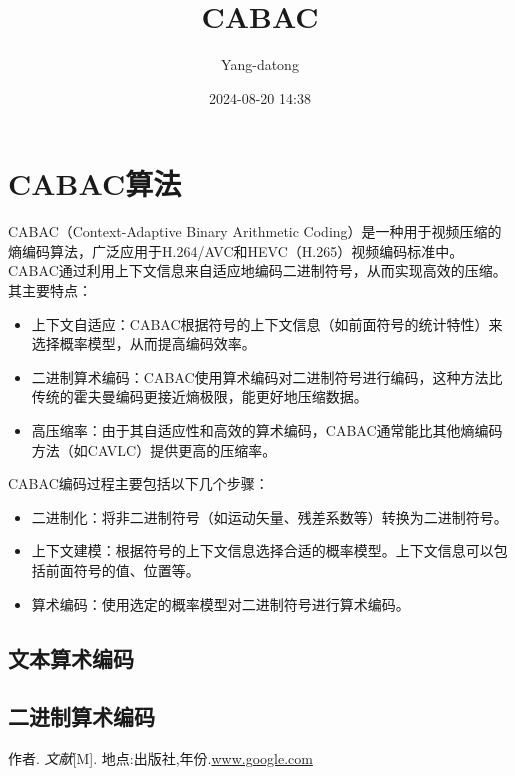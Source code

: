 \documentclass{/home/hi/Study/template/code}
\title{CABAC}
\author{\textcopyright Yang-datong }
\date{2024-08-20 14:38}
\begin{document}
\makehead
\section{CABAC算法}
CABAC（Context-Adaptive Binary Arithmetic Coding）是一种用于视频压缩的熵编码算法，广泛应用于H.264/AVC和HEVC（H.265）视频编码标准中。CABAC通过利用上下文信息来自适应地编码二进制符号，从而实现高效的压缩。其主要特点：
\begin{itemize}
	\item 上下文自适应：CABAC根据符号的上下文信息（如前面符号的统计特性）来选择概率模型，从而提高编码效率。
	\item 二进制算术编码：CABAC使用算术编码对二进制符号进行编码，这种方法比传统的霍夫曼编码更接近熵极限，能更好地压缩数据。
	\item 高压缩率：由于其自适应性和高效的算术编码，CABAC通常能比其他熵编码方法（如CAVLC）提供更高的压缩率。
\end{itemize}

CABAC编码过程主要包括以下几个步骤：
\begin{itemize}
	\item 二进制化：将非二进制符号（如运动矢量、残差系数等）转换为二进制符号。
	\item 上下文建模：根据符号的上下文信息选择合适的概率模型。上下文信息可以包括前面符号的值、位置等。
	\item 算术编码：使用选定的概率模型对二进制符号进行算术编码。
\end{itemize}

\subsection{文本算术编码}

\subsection{二进制算术编码}

\newpage
\begin{thebibliography}{1}
	 作者. \emph{文献}[M]. 地点:出版社,年份.\url{www.google.com}
\end{thebibliography}
\end{document}
